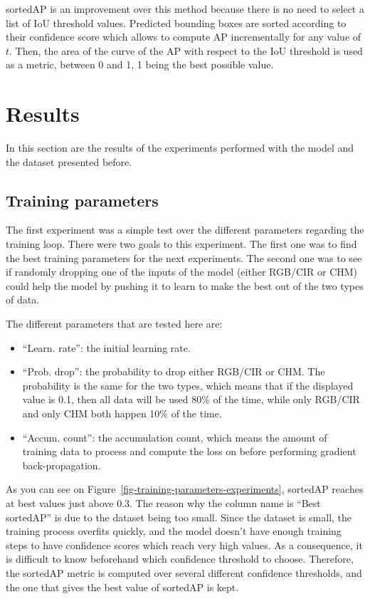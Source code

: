 \documentclass[
  letterpaper,
  DIV=11,
  numbers=noendperiod]{scrartcl}
\providecommand{\tightlist}{%
  \setlength{\itemsep}{0pt}\setlength{\parskip}{0pt}}\usepackage{longtable,booktabs,array}
\begin{document}
sortedAP is an improvement over this method because there is no need to
select a list of IoU threshold values. Predicted bounding boxes are
sorted according to their confidence score which allows to compute
\(\text{AP}\) incrementally for any value of \(t\). Then, the area of
the curve of the AP with respect to the IoU threshold is used as a
metric, between 0 and 1, 1 being the best possible value.

\section{Results}\label{results}

In this section are the results of the experiments performed with the
model and the dataset presented before.

\subsection{Training parameters}\label{training-parameters}

The first experiment was a simple test over the different parameters
regarding the training loop. There were two goals to this experiment.
The first one was to find the best training parameters for the next
experiments. The second one was to see if randomly dropping one of the
inputs of the model (either RGB/CIR or CHM) could help the model by
pushing it to learn to make the best out of the two types of data.

The different parameters that are tested here are:

\begin{itemize}
\tightlist
\item
  ``Learn. rate'': the initial learning rate.
\item
  ``Prob. drop'': the probability to drop either RGB/CIR or CHM. The
  probability is the same for the two types, which means that if the
  displayed value is 0.1, then all data will be used 80\% of the time,
  while only RGB/CIR and only CHM both happen 10\% of the time.
\item
  ``Accum. count'': the accumulation count, which means the amount of
  training data to process and compute the loss on before performing
  gradient back-propagation.
\end{itemize}

As you can see on Figure~\ref{fig-training-parameters-experiments},
sortedAP reaches at best values just above 0.3. The reason why the
column name is ``Best sortedAP'' is due to the dataset being too small.
Since the dataset is small, the training process overfits quickly, and
the model doesn't have enough training steps to have confidence scores
which reach very high values. As a consequence, it is difficult to know
beforehand which confidence threshold to choose. Therefore, the sortedAP
metric is computed over several different confidence thresholds, and the
one that gives the best value of sortedAP is kept.
\end{document}
